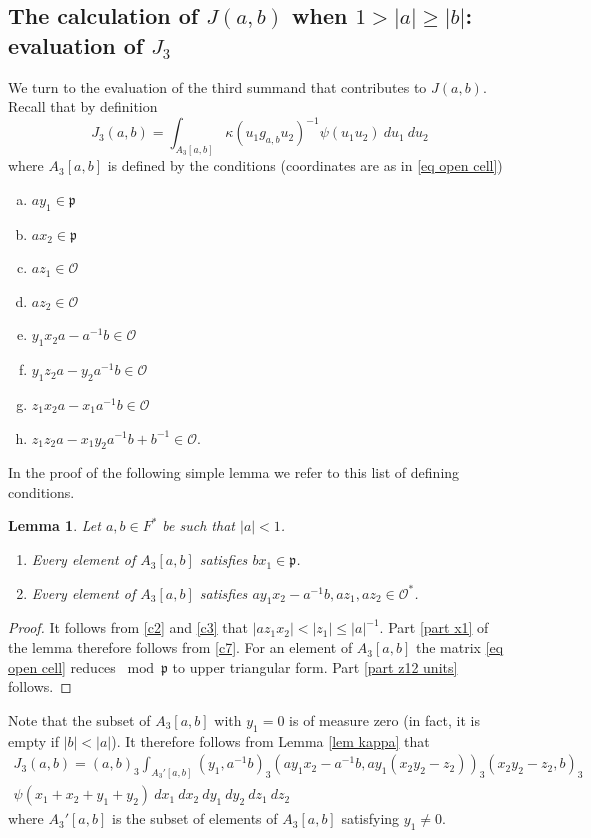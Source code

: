 \documentclass[12pt]{amsart}
\newcommand{\abs}[1]{\left|{#1}\right|}
\newcommand{\p}{\mathfrak{p}}
\renewcommand{\O}{\mathcal{O}}
\newtheorem{lemma}[theorem]{Lemma}
\theoremstyle{remark}
\begin{document}
\subsection{The calculation of $J(a,b)$ when $1>\abs{a}\ge\abs{b}$:  evaluation of $J_3$}
We turn to the evaluation of the third summand that contributes to $J(a,b)$.
Recall that by definition
\[
J_3(a,b)= \int_{A_3[a,b]}\kappa(u_1g_{a,b}u_2)^{-1}\psi(u_1u_2)\ du_1\ du_2
\]
where $A_3[a,b]$ is defined by the conditions (coordinates are as in \eqref {eq open cell})
\begin{enumerate}[a)]
\item\label{c1} $ay_1\in \p$
\item\label{c2} $ax_2\in \p$
\item\label{c3} $az_1\in \O$
\item\label{c4} $az_2\in \O$
\item\label{c5} $y_1x_2 a-a^{-1}b\in \O$
\item\label{c6} $y_1z_2a-y_2a^{-1}b\in \O$
\item\label{c7} $z_1x_2a-x_1a^{-1}b\in \O$
\item\label{c8} $z_1z_2 a-x_1y_2a^{-1}b+b^{-1}\in \O$.
\end{enumerate}


In the proof of the following simple lemma we refer to this list of defining conditions.
\begin{lemma}\label{lem A3basic}
Let $a,b\in F^*$ be such that $\abs{a}<1$.
\begin{enumerate}
\item\label{part x1} Every element of $A_3[a,b]$ satisfies $bx_1\in\p$.
\item\label{part z12 units} Every element of $A_3[a,b]$ satisfies $ay_1x_2-a^{-1}b,az_1,az_2\in\O^*$.
\end{enumerate}
\end{lemma}
\begin{proof}
It follows from \ref{c2} and \ref{c3} that $\abs{az_1x_2}<\abs{z_1}\le \abs{a}^{-1}$. Part \ref{part x1} of the lemma therefore follows from \ref{c7}.
For an element of $A_3[a,b]$ the matrix \eqref {eq open cell} reduces $\bmod \p$ to upper triangular form. Part \ref{part z12 units} follows.
\end{proof}

Note that the subset of $A_3[a,b]$ with $y_1=0$ is of measure zero (in fact, it is empty if $\abs{b}<\abs{a}$). It therefore follows from Lemma \ref{lem kappa} that 
\begin{multline}\label{eq j3}
J_3(a,b)=(a,b)_3\int_{A_3'[a,b]}  (y_1,a^{-1}b)_3(ay_1x_2-a^{-1}b,ay_1(x_2y_2-z_2))_3(x_2y_2-z_2,b)_3 \\ \psi(x_1+x_2+y_1+y_2)\ dx_1\ dx_2\ dy_1\ dy_2\ dz_1\ dz_2
\end{multline}
where $A_3'[a,b]$ is the subset of elements of $A_3[a,b]$ satisfying $y_1\ne 0$. 
\end{document}
